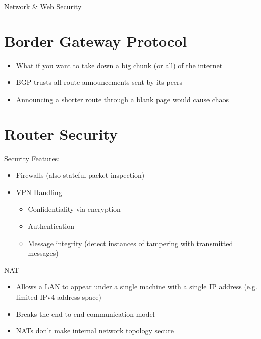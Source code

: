 \documentclass{article}[18pt]
\begin{document}
\begin{center}
\underline{\huge Network \& Web Security}
\end{center}
\section{Border Gateway Protocol}
\begin{itemize}
	\item What if you want to take down a big chunk (or all) of the internet
	\item BGP trusts all route announcements sent by its peers
	\item Announcing a shorter route through a blank page would cause chaos
\end{itemize}
\section{Router Security}
Security Features:
\begin{itemize}
	\item Firewalls (also stateful packet inspection)
	\item VPN Handling
	\begin{itemize}
		\item Confidentiality via encryption
		\item Authentication
		\item Message integrity (detect instances of tampering with transmitted messages)
	\end{itemize}
\end{itemize}
NAT
\begin{itemize}
	\item Allows a LAN to appear under a single machine with a single IP address (e.g. limited IPv4 address space)
	\item Breaks the end to end communication model
	\item NATs don't make internal network topology secure
\end{itemize}
\end{document}
